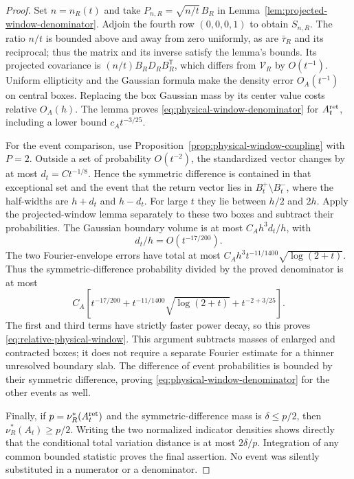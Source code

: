 \begin{proof}
Set $n=n_R(t)$ and take
$P_{n,R}=\sqrt{n/t}\,B_R$ in
Lemma~\ref{lem:projected-window-denominator}. Adjoin the fourth row
$(0,0,0,1)$ to obtain $S_{n,R}$. The ratio $n/t$ is bounded above
and away from zero uniformly, as are $\bar\tau_R$ and its reciprocal;
thus the matrix and its inverse satisfy the lemma's bounds.
Its projected covariance is $(n/t)B_RD_RB_R^{\mathsf T}$, which
differs from $\mathcal V_R$ by $O(t^{-1})$. Uniform ellipticity and
the Gaussian formula make the density error $O_A(t^{-1})$ on central
boxes. Replacing the box Gaussian mass by its center value costs
relative $O_A(h)$. The lemma proves
\eqref{eq:physical-window-denominator} for $A_t^{\rm ret}$,
including a lower bound $c_A t^{-3/25}$.

For the event comparison, use
Proposition~\ref{prop:physical-window-coupling} with $P=2$.
Outside a set of probability $O(t^{-2})$, the standardized vector
changes by at most $d_t=Ct^{-1/8}$. Hence the symmetric difference
is contained in that exceptional set and the event that the return
vector lies in $B_t^+\setminus B_t^-$, where the half-widths are
$h+d_t$ and $h-d_t$. For large $t$ they lie between $h/2$ and $2h$.
Apply the projected-window lemma separately to these two boxes and
subtract their probabilities. The Gaussian boundary volume is at
most $C_A h^3 d_t/h$, with
\[
 d_t/h=O(t^{-17/200}).
\]
The two Fourier-envelope errors have total at most
$C_A h^3 t^{-11/1400}\sqrt{\log(2+t)}$. Thus the symmetric-difference
probability divided by the proved denominator is at most
\[
 C_A\left[t^{-17/200}+t^{-11/1400}\sqrt{\log(2+t)}
                                      +t^{-2+3/25}\right].
\]
The first and third terms have strictly faster power decay, so this proves
\eqref{eq:relative-physical-window}. This argument subtracts masses
of enlarged and contracted boxes; it does not require a separate
Fourier estimate for a thinner unresolved boundary slab.
The difference of event probabilities is bounded by their symmetric
difference, proving \eqref{eq:physical-window-denominator} for the
other events as well.

Finally, if $p=\nu_R^*(A_t^{\rm ret})$ and the symmetric-difference
mass is $\delta\le p/2$, then $\nu_R^*(A_t)\ge p/2$.
Writing the two normalized indicator densities shows directly that
the conditional total variation distance is at most $2\delta/p$.
Integration of any common bounded statistic proves the final assertion.
No event was silently substituted in a numerator or a denominator.
\end{proof}

